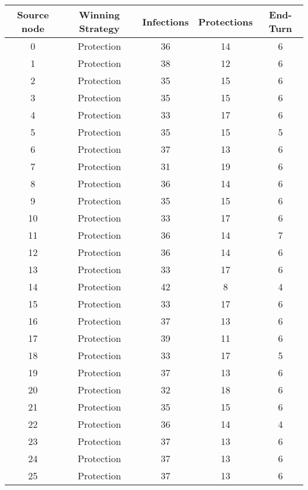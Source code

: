\documentclass[results.tex]{subfiles}
\begin{document}
\begin{center}
  \begin{tabular}{| c || c | c | c | c |}
    \hline
    {\bfseries Source node} & {\bfseries Winning Strategy} & {\bfseries Infections} & {\bfseries Protections} & {\bfseries End-Turn} \\  %
    \hline\hline
    0 & Protection & 36 & 14 & 6 \\ 
    \hline
    1 & Protection & 38 & 12 & 6 \\ 
    \hline
    2 & Protection & 35 & 15 & 6 \\ 
    \hline
    3 & Protection & 35 & 15 & 6 \\ 
    \hline
    4 & Protection & 33 & 17 & 6 \\ 
    \hline
    5 & Protection & 35 & 15 & 5 \\ 
    \hline
    6 & Protection & 37 & 13 & 6 \\ 
    \hline
    7 & Protection & 31 & 19 & 6 \\ 
    \hline
    8 & Protection & 36 & 14 & 6 \\ 
    \hline
    9 & Protection & 35 & 15 & 6 \\ 
    \hline
    10 & Protection & 33 & 17 & 6 \\ 
    \hline
    11 & Protection & 36 & 14 & 7 \\ 
    \hline
    12 & Protection & 36 & 14 & 6 \\ 
    \hline
    13 & Protection & 33 & 17 & 6 \\ 
    \hline
    14 & Protection & 42 & 8 & 4 \\ 
    \hline
    15 & Protection & 33 & 17 & 6 \\ 
    \hline
    16 & Protection & 37 & 13 & 6 \\ 
    \hline
    17 & Protection & 39 & 11 & 6 \\ 
    \hline
    18 & Protection & 33 & 17 & 5 \\ 
    \hline
    19 & Protection & 37 & 13 & 6 \\ 
    \hline
    20 & Protection & 32 & 18 & 6 \\ 
    \hline
    21 & Protection & 35 & 15 & 6 \\ 
    \hline
    22 & Protection & 36 & 14 & 4 \\ 
    \hline
    23 & Protection & 37 & 13 & 6 \\ 
    \hline
    24 & Protection & 37 & 13 & 6 \\ 
    \hline
    25 & Protection & 37 & 13 & 6 \\ 

\end{tabular}
\end{center}
\end{document}
